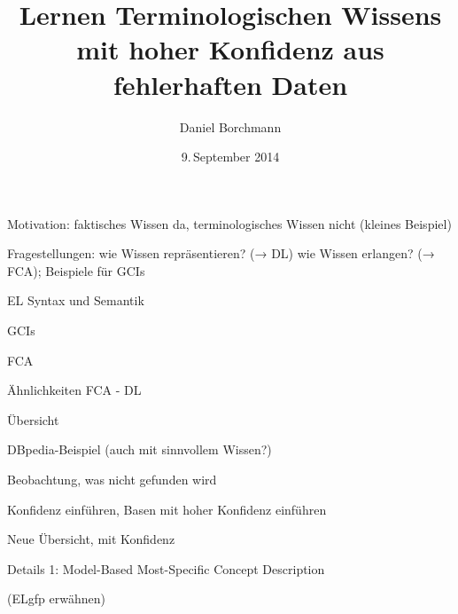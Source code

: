 \documentclass{beamer}
\title{Lernen Terminologischen Wissens\\ mit hoher Konfidenz aus fehlerhaften Daten}
\author{Daniel Borchmann}
\date{9.\,September 2014}
\begin{document}
\begin{frame}[plain]
  \maketitle
\end{frame}

\begin{frame}
  Motivation: faktisches Wissen da, terminologisches Wissen nicht (kleines Beispiel)
\end{frame}

\begin{frame}
  Fragestellungen: wie Wissen repräsentieren? (→ DL) wie Wissen erlangen? (→ FCA);
  Beispiele für GCIs
\end{frame}

\begin{frame}
  EL Syntax und Semantik
\end{frame}

\begin{frame}
  GCIs
\end{frame}

\begin{frame}
  FCA
\end{frame}

\begin{frame}
  Ähnlichkeiten FCA - DL
\end{frame}

\begin{frame}
  Übersicht
\end{frame}

\begin{frame}
  DBpedia-Beispiel (auch mit sinnvollem Wissen?)
\end{frame}

\begin{frame}
  Beobachtung, was nicht gefunden wird
\end{frame}

\begin{frame}
  Konfidenz einführen, Basen mit hoher Konfidenz einführen
\end{frame}

\begin{frame}
  Neue Übersicht, mit Konfidenz
\end{frame}

\begin{frame}
  Details 1: Model-Based Most-Specific Concept Description

  (ELgfp erwähnen)
\end{frame}
\end{document}
